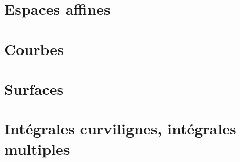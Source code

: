 \documentclass{Math}
\theoremstyle{plain}
\begin{document}
\part{Espaces affines}
% 
% 
% 
% 
\newpage
\part{Courbes}
% 
% 
% 
% 
\newpage
\part{Surfaces}
% 
% 
% 
% 
\newpage
\part{Intégrales curvilignes, intégrales multiples}
% 
% 
% 
% 

\printindex
\end{document}
